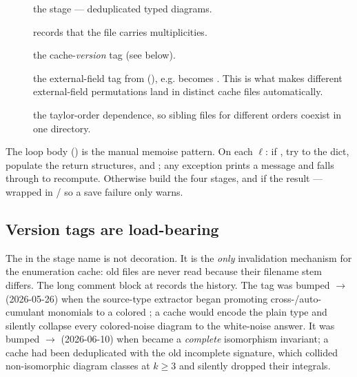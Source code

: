 \begin{description}
  \item[] the stage --- deduplicated typed diagrams.
  \item[] records that the file carries multiplicities.
  \item[] the cache-\emph{version} tag (see below).
  \item[] the external-field tag from
         (), e.g.
        \code{[('v',1),('v',2)]} becomes . This is what makes
        different external-field permutations land in distinct cache files
        automatically.
  \item[] the taylor-order dependence, so sibling files for
        different orders coexist in one directory.
\end{description}

The loop body () is the manual memoise pattern. On
each $\ell$: if , try to 
the  dict, populate the return structures,
and ; any exception prints a  message and falls through to recompute. Otherwise build the four
stages, and if   the result --- wrapped in
/ so a save failure only warns.

\subsection{Version tags are load-bearing}

The  in the stage name is not decoration. It is the \emph{only}
invalidation mechanism for the enumeration cache: old files are never read
because their filename stem differs. The long comment block at
 records the history. The tag was bumped
$\to$ (2026-05-26) when the source-type extractor began
promoting cross-/auto-cumulant monomials to a colored ; a
 cache would encode the plain type and silently collapse every
colored-noise diagram to the white-noise answer. It was bumped
$\to$ (2026-06-10) when  became a
\emph{complete} isomorphism invariant; a  cache had been deduplicated
with the old incomplete signature, which collided non-isomorphic diagram classes
at $k\ge 3$ and silently dropped their integrals.

